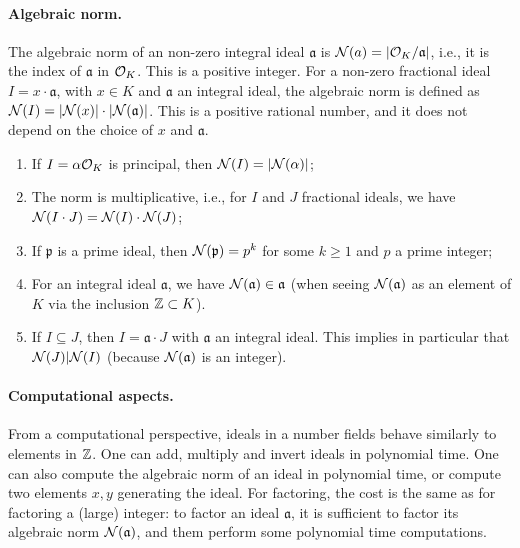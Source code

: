 \paragraph{Algebraic norm.} The algebraic norm of an non-zero integral ideal $\mathfrak{a}$ is $\mathcal{N}(a) = |\mathcal{O}_K/\mathfrak{a}|$, i.e., it is the index of $\mathfrak{a}$ in $\mathcal{O}_K$. This is a positive integer. For a non-zero fractional ideal $I = x \cdot \mathfrak{a}$, with $x \in K$ and $\mathfrak{a}$ an integral ideal, the algebraic norm is defined as $\mathcal{N}(I) = |\mathcal{N}(x)| \cdot |\mathcal{N}(\mathfrak{a})|$. This is a positive rational number, and it does not depend on the choice of $x$ and $\mathfrak{a}$.

\begin{properties}
\label{prop:norm-ideal}
\begin{enumerate}
\item If $I = \alpha \mathcal{O}_K$ is principal, then $\mathcal{N}(I) = |\mathcal{N}(\alpha)|$;
\item The norm is multiplicative, i.e., for $I$ and $J$ fractional ideals, we have $\mathcal{N}(I \cdot J) = \mathcal{N}(I) \cdot \mathcal{N}(J)$;
\item If $\mathfrak{p}$ is a prime ideal, then $\mathcal{N}(\mathfrak{p}) = p^k$ for some $k \geq 1$ and $p$ a prime integer;
\item For an integral ideal $\mathfrak{a}$, we have $\mathcal{N}(\mathfrak{a}) \in \mathfrak{a}$ (when seeing $\mathcal{N}(\mathfrak{a})$ as an element of $K$ via the inclusion $\mathbb{Z} \subset K$).
\item If $I \subseteq J$, then $I = \mathfrak{a} \cdot J$ with $\mathfrak{a}$ an integral ideal. This implies in particular that $\mathcal{N}(J) |\mathcal{N}(I)$ (because $\mathcal{N}(\mathfrak{a})$ is an integer).
\end{enumerate}
\end{properties}


\paragraph{Computational aspects.} 
From a computational perspective, ideals in a number fields behave similarly to elements in $\mathbb{Z}$. One can add, multiply and invert ideals in polynomial time. One can also compute the algebraic norm of an ideal in polynomial time, or compute two elements $x,y$ generating the ideal.
For factoring, the cost is the same as for factoring a (large) integer: to factor an ideal $\mathfrak{a}$, it is sufficient to factor its algebraic norm $\mathcal{N}(\mathfrak{a})$, and them perform some polynomial time computations.

